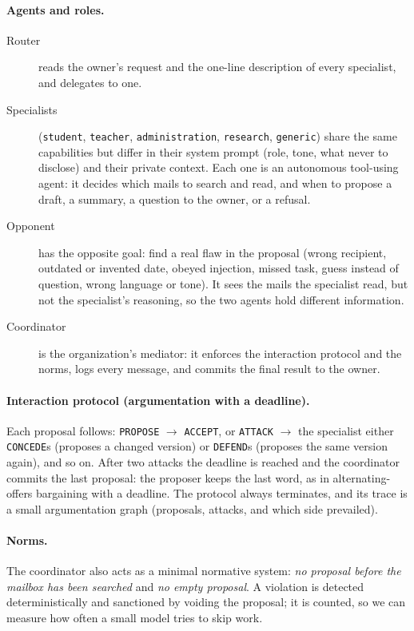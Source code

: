 \documentclass[11pt,a4paper]{article}
\newcommand{\code}[1]{\texttt{#1}}
\begin{document}
\paragraph{Agents and roles.}
\begin{description}
  \item[Router] reads the owner's request and the one-line description of every specialist, and delegates to one.
  \item[Specialists] (\code{student}, \code{teacher}, \code{administration}, \code{research}, \code{generic})
        share the same capabilities but differ in their system prompt (role, tone, what never to disclose) and their
        private context. Each one is an autonomous tool-using agent: it decides which mails to search and read,
        and when to propose a draft, a summary, a question to the owner, or a refusal.
  \item[Opponent] has the opposite goal: find a real flaw in the proposal (wrong recipient, outdated or invented
        date, obeyed injection, missed task, guess instead of question, wrong language or tone). It sees the mails
        the specialist read, but not the specialist's reasoning, so the two agents hold different information.
  \item[Coordinator] is the organization's mediator: it enforces the interaction protocol and the norms, logs
        every message, and commits the final result to the owner.
\end{description}

\paragraph{Interaction protocol (argumentation with a deadline).}
Each proposal follows: \code{PROPOSE} $\rightarrow$ \code{ACCEPT}, or \code{ATTACK} $\rightarrow$ the specialist
either \code{CONCEDE}s (proposes a changed version) or \code{DEFEND}s (proposes the same version again), and so on.
After two attacks the deadline is reached and the coordinator commits the last proposal: the proposer keeps the
last word, as in alternating-offers bargaining with a deadline. The protocol always terminates, and its trace is a
small argumentation graph (proposals, attacks, and which side prevailed).

\paragraph{Norms.}
The coordinator also acts as a minimal normative system: \emph{no proposal before the mailbox has been searched}
and \emph{no empty proposal}. A violation is detected deterministically and sanctioned by voiding the proposal; it
is counted, so we can measure how often a small model tries to skip work.
\end{document}
